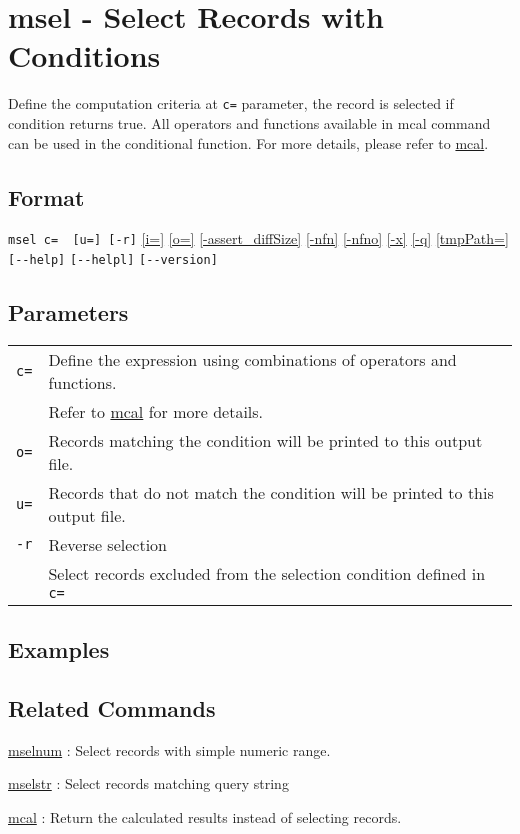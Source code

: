 
%

\section{msel - Select Records with Conditions\label{sect:msel}}
Define the computation criteria at \verb|c=| parameter, the record is selected if condition returns true. 
All operators and functions available in mcal command can be used in the conditional function. For more details, please refer to \hyperref[sect:mcal]{mcal}.

\subsection*{Format}
\verb|msel c=  [u=] [-r]|
\hyperref[sect:option_i]{[i=]}
\hyperref[sect:option_o]{[o=]}
\hyperref[sect:option_assert_diffSize]{[-assert\_diffSize]}
\hyperref[sect:option_nfn]{[-nfn]} 
\hyperref[sect:option_nfno]{[-nfno]}  
\hyperref[sect:option_x]{[-x]}
\hyperref[sect:option_q]{[-q]}
\hyperref[sect:option_option_tmppath]{[tmpPath=]}
\verb|[--help]|
\verb|[--helpl]|
\verb|[--version]|\\


\subsection*{Parameters}
\begin{table}[htbp]
{\small
\begin{tabular}{ll}
\verb|c=|    & Define the expression using combinations of operators and functions.  \\
             & Refer to \hyperref[sect:mcal]{mcal} for more details. \\
\verb|o=|    & Records matching the condition will be printed to this output file. \\
\verb|u=|    & Records that do not match the condition will be printed to this output file.\\
\verb|-r|    & Reverse selection\\
             & Select records excluded from the selection condition defined in \verb|c=|\\
\end{tabular} 
}
\end{table} 



\subsection*{Examples}


\subsection*{Related Commands}
\hyperref[sect:mselnum]{mselnum} : Select records with simple numeric range. 

\hyperref[sect:mselstr]{mselstr} : Select records matching query string

\hyperref[sect:mcal]{mcal} : Return the calculated results instead of selecting records. 

%
